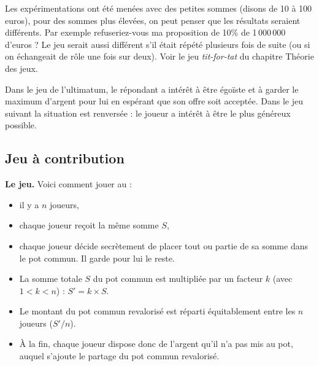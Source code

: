 \documentclass[11pt,class=report,crop=false]{standalone}
\begin{document}
Les expérimentations ont été menées avec des petites sommes (disons de 10 à 100 euros), pour des sommes plus élevées, on peut penser que les résultats seraient différents. Par exemple refuseriez-vous ma proposition de 10\% de 1\,000\,000 d'euros ?
Le jeu serait aussi différent s'il était répété plusieurs fois de suite (ou si on échangeait de rôle une fois sur deux). Voir le jeu \emph{tit-for-tat} du chapitre \og{}Théorie des jeux\fg{}.


\medskip
Dans le jeu de l'ultimatum, le répondant a intérêt à être égoïste et à garder le maximum d'argent pour lui en espérant que son offre soit acceptée. Dans le jeu suivant la situation est renversée : le joueur a intérêt à être le plus généreux possible.

\subsection{Jeu à contribution}


\textbf{Le jeu.}
Voici comment jouer au  :
\begin{itemize}
	\item il y a $n$ joueurs,
	\item chaque joueur reçoit la même somme $S$,
	\item chaque joueur décide secrètement de placer tout ou partie de sa somme dans le pot commun. Il garde pour lui le reste.
	\item La somme totale $S$ du pot commun est multipliée par un facteur $k$ (avec $1 < k < n$) : $S'= k \times S$.
	\item Le montant du pot commun revalorisé est réparti équitablement entre les $n$ joueurs ($S'/n$).
	\item À la fin, chaque joueur dispose donc de l'argent qu'il n'a pas mis au pot, auquel s'ajoute le partage du pot commun revalorisé.
\end{itemize}

%
%
%	
\end{document}
